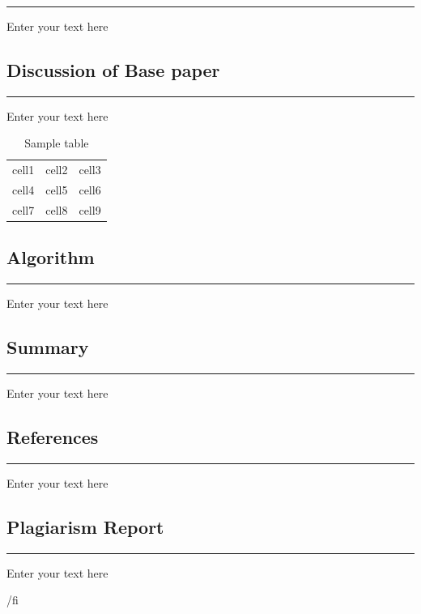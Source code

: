 \hrule
Enter your text here
\newpage


\begin{flushright}
\section{\Large Discussion of Base paper}
\end{flushright}

\hrule
Enter your text here



\begin{table}[h!]
\centering
\caption{Sample table}
\begin{tabular}{ |c|c|c| } 
 \hline
 cell1 & cell2 & cell3 \\ 
 cell4 & cell5 & cell6 \\ 
 cell7 & cell8 & cell9 \\ 
 \hline
\end{tabular}
\end{table}


\newpage
\begin{flushright}
\section{\Large Algorithm}
\end{flushright}

\hrule
Enter your text here
\newpage

\begin{flushright}
	\section{\Large Summary}
\end{flushright}

\hrule
Enter your text here
\newpage


\begin{flushright}
\section*{\Large References}
\end{flushright}

\hrule
Enter your text here
\newpage

\begin{flushright}
\section*{\Large Plagiarism Report}

\end{flushright}

\hrule
Enter your text here
\newpage

/fi

